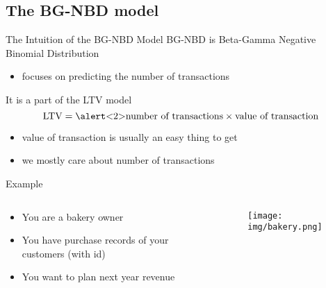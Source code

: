 \documentclass{beamer}
\begin{document}
\subsection{The BG-NBD model}
\begin{frame}{The Intuition of the BG-NBD Model}
    BG-NBD is Beta-Gamma Negative Binomial Distribution
    \begin{itemize}
        \item focuses on predicting the number of transactions
    \end{itemize}
It is a part of the LTV model
\begin{equation*}
    \text{LTV} = \text{\alert<2>{number of transactions}} \times \text{value of transaction}
\end{equation*}
\pause
\begin{itemize}
    \item value of transaction is usually an easy thing to get
    \item we mostly care about number of transactions
\end{itemize}
\end{frame}
\begin{frame}{Example}
\begin{columns}
    \begin{column}{0.5\linewidth}
    \begin{itemize}
        \item You are a bakery owner
        \item You have purchase records of your customers (with id)
        \item You want to plan next year revenue
    \end{itemize}
    \end{column}
    \begin{column}{0.5\linewidth}
    \begin{figure}
        \centering
        \texttt{[image: img/bakery.png]}
    \end{figure}    
    \end{column}
\end{columns}
\end{frame}
\end{document}
